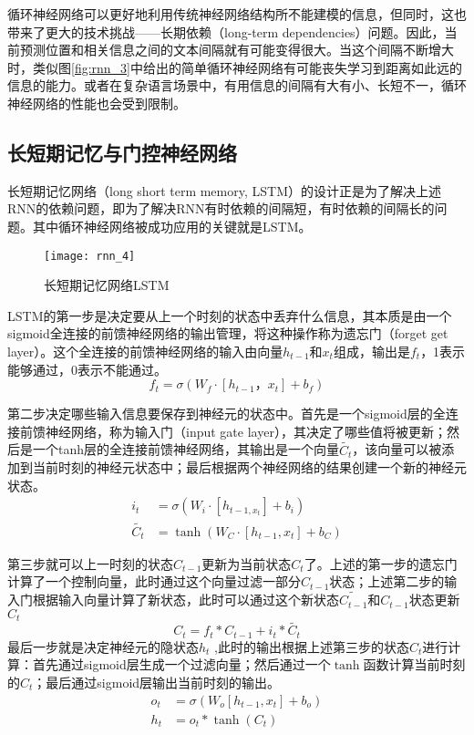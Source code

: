 循环神经网络可以更好地利用传统神经网络结构所不能建模的信息，但同时，这也带来了更大的技术挑战——长期依赖（long-term dependencies）问题。因此，当前预测位置和相关信息之间的文本间隔就有可能变得很大。当这个间隔不断增大时，类似图\ref{fig:rnn_3}中给出的简单循环神经网络有可能丧失学习到距离如此远的信息的能力。或者在复杂语言场景中，有用信息的间隔有大有小、长短不一，循环神经网络的性能也会受到限制。

\subsection{长短期记忆与门控神经网络}

长短期记忆网络（long short term memory, LSTM）\cite{LSTM}的设计正是为了解决上述RNN的依赖问题，即为了解决RNN有时依赖的间隔短，有时依赖的间隔长的问题。其中循环神经网络被成功应用的关键就是LSTM。

\begin{figure}[htp]
\centering
\texttt{[image: rnn\_4]}
\caption{长短期记忆网络LSTM}
\label{fig:rnn_4}
\end{figure}

LSTM的第一步是决定要从上一个时刻的状态中丢弃什么信息，其本质是由一个sigmoid全连接的前馈神经网络的输出管理，将这种操作称为遗忘门（forget get layer）。这个全连接的前馈神经网络的输入由向量$h_{t-1}$​和$x_t$组成，输出是$f_t$，1表示能够通过，0表示不能通过。
\begin{equation}
    f_t = \sigma(W_f \cdot [h_{t-1}，x_t]+b_f)
\end{equation}

第二步决定哪些输入信息要保存到神经元的状态中。首先是一个sigmoid层的全连接前馈神经网络，称为输入门（input gate layer），其决定了哪些值将被更新；然后是一个tanh层的全连接前馈神经网络，其输出是一个向量$\tilde{C_t}$，该向量可以被添加到当前时刻的神经元状态中；最后根据两个神经网络的结果创建一个新的神经元状态。
\begin{align}
    i_t &= \sigma(W_i \cdot [h_{t-1,x_t}]+b_i) \\
    \tilde{C_t} &= \tanh(W_C \cdot [h_{t-1},x_t]+b_C)
\end{align}

第三步就可以上一时刻的状态$C_{t−1}$更新为当前状态$C_t$了。上述的第一步的遗忘门计算了一个控制向量，此时通过这个向量过滤一部分$C_{t-1}$状态；上述第二步的输入门根据输入向量计算了新状态，此时可以通过这个新状态$\tilde{C_{t-1}}$和$C_{t−1}$状态更新$C_t$
\begin{equation}
    C_t = f_t*C_{t-1} + i_t*\tilde{C_t}
\end{equation}
​	
最后一步就是决定神经元的隐状态$h_t$	,此时的输出根据上述第三步的状态$C_t$进行计算：首先通过sigmoid层生成一个过滤向量；然后通过一个$\tanh$函数计算当前时刻的$C_t$；最后通过sigmoid层输出当前时刻的输出。
\begin{align}
    o_t &= \sigma(W_o [h_{t-1},x_t]+b_o) \\
    h_t &= o_t * \tanh(C_t)
\end{align}

